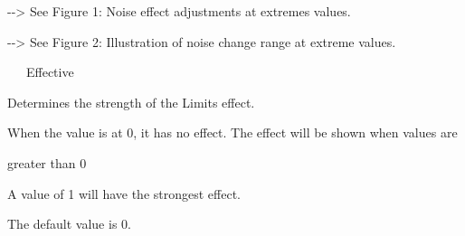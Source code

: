 \documentclass[a4paper,12pt]{article}
\begin{document}
-{-}> See Figure 1: \textquotedbl Noise effect adjustments at extremes values\textquotedbl.\par
-{-}> See Figure 2: \textquotedbl Illustration of noise change range at extreme values\textquotedbl.\\
\par
\noindent \ \ \, Effective\par
Determines the strength of the Limits effect.\par
When the value is at 0, it has no effect. The effect will be shown when values are\par 
greater than 0\par
A value of 1 will have the strongest effect.\par
The default value is 0.\\
\par

\newpage

\thispagestyle{empty}
\end{document}

